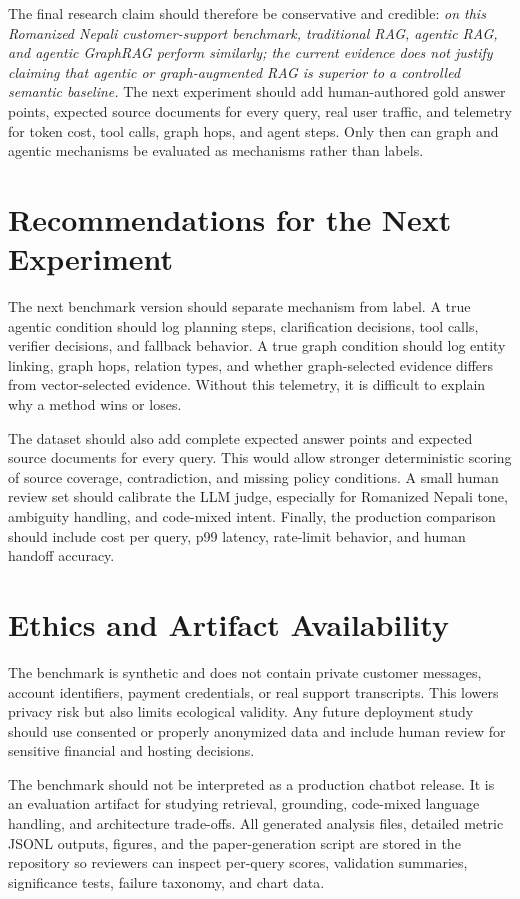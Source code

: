 \documentclass[10pt,twocolumn]{article}
\begin{document}
The final research claim should therefore be conservative and credible: \emph{on this Romanized Nepali customer-support benchmark, traditional RAG, agentic RAG, and agentic GraphRAG perform similarly; the current evidence does not justify claiming that agentic or graph-augmented RAG is superior to a controlled semantic baseline.} The next experiment should add human-authored gold answer points, expected source documents for every query, real user traffic, and telemetry for token cost, tool calls, graph hops, and agent steps. Only then can graph and agentic mechanisms be evaluated as mechanisms rather than labels.

\section{Recommendations for the Next Experiment}

The next benchmark version should separate mechanism from label. A true agentic condition should log planning steps, clarification decisions, tool calls, verifier decisions, and fallback behavior. A true graph condition should log entity linking, graph hops, relation types, and whether graph-selected evidence differs from vector-selected evidence. Without this telemetry, it is difficult to explain why a method wins or loses.

The dataset should also add complete expected answer points and expected source documents for every query. This would allow stronger deterministic scoring of source coverage, contradiction, and missing policy conditions. A small human review set should calibrate the LLM judge, especially for Romanized Nepali tone, ambiguity handling, and code-mixed intent. Finally, the production comparison should include cost per query, p99 latency, rate-limit behavior, and human handoff accuracy.

\section*{Ethics and Artifact Availability}

The benchmark is synthetic and does not contain private customer messages, account identifiers, payment credentials, or real support transcripts. This lowers privacy risk but also limits ecological validity. Any future deployment study should use consented or properly anonymized data and include human review for sensitive financial and hosting decisions.

The benchmark should not be interpreted as a production chatbot release. It is an evaluation artifact for studying retrieval, grounding, code-mixed language handling, and architecture trade-offs. All generated analysis files, detailed metric JSONL outputs, figures, and the paper-generation script are stored in the repository so reviewers can inspect per-query scores, validation summaries, significance tests, failure taxonomy, and chart data.
\end{document}
